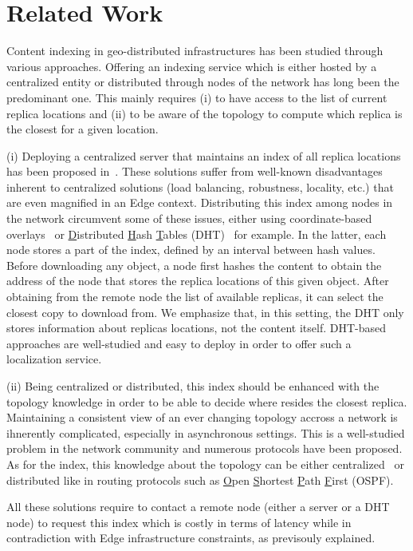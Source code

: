 
\section{Related Work}
\label{sec:related_work}
Content indexing in geo-distributed infrastructures has been studied through various approaches. 
Offering an indexing service which is either hosted by a centralized entity or distributed through nodes of the network has long been the predominant one. This mainly requires (i) to have access to the list of current replica locations and (ii) to be aware of the topology to compute which replica is the closest for a given location. 

(i) Deploying a centralized server that maintains an index of all replica locations has been proposed in~\cite{snamp, p2p-oracle, fogstore, p2p-alto}. These solutions suffer from well-known disadvantages inherent to centralized solutions (load balancing, robustness, locality, etc.) that are even magnified in an Edge context.
Distributing this index among nodes in the network circumvent some of these issues, either using coordinate-based overlays~\cite{voronet, coin_19} or \underline{D}istributed \underline{H}ash \underline{T}ables (DHT)~\cite{ipfs, mdht, squirrel} for example. In the latter, each node stores a part of the index, defined by an interval between hash values. 
Before downloading any object, a node first
hashes the content to obtain the address of the node that stores the replica locations of this given object. After obtaining from the remote node the list of available replicas, it can select the closest copy to download from. We emphasize that, in this setting, the DHT only stores information about replicas locations, not the content itself. DHT-based approaches are well-studied and easy to deploy in order to offer such a localization service. 


(ii) Being centralized or distributed, this index should be enhanced with the topology knowledge in order to be able to decide where resides the closest replica. Maintaining a consistent view of an ever changing topology accross a network is ihnerently complicated, especially in asynchronous settings. This is a well-studied problem in the network community and numerous protocols have been proposed. As for the index, this knowledge about the topology can be either centralized~\cite{topology-discovery} or distributed like in routing protocols such as \underline{O}pen \underline{S}hortest \underline{P}ath \underline{F}irst (OSPF).


All these solutions require to contact a remote node (either a server or a DHT node) to request this index 
which is costly in terms of latency while in contradiction with Edge infrastructure constraints, as previsouly explained.


